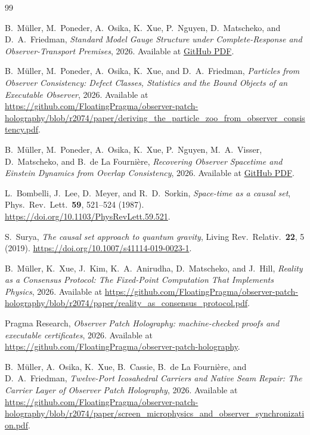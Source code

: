\documentclass[11pt]{article}
\begin{document}
\begin{thebibliography}{99}

B.~M\"uller, M.~Poneder, A.~Osika, K.~Xue, P.~Nguyen, D.~Matscheko, and D.~A.~Friedman,
\emph{Standard Model Gauge Structure under Complete-Response and Observer-Transport Premises},
2026.
Available at \href{https://github.com/FloatingPragma/observer-patch-holography/blob/r2074/paper/deriving_standard_model_gauge_structure_from_observer_overlap_consistency.pdf}{GitHub PDF}.

B.~M\"uller, M.~Poneder, A.~Osika, K.~Xue, and D.~A.~Friedman,
\emph{Particles from Observer Consistency: Defect Classes, Statistics and the Bound Objects of an Executable Observer},
2026.
Available at \url{https://github.com/FloatingPragma/observer-patch-holography/blob/r2074/paper/deriving_the_particle_zoo_from_observer_consistency.pdf}.

B.~M\"uller, M.~Poneder, A.~Osika, K.~Xue, P.~Nguyen, M.~A.~Visser, D.~Matscheko, and B.~de La Fourni\`ere,
\emph{Recovering Observer Spacetime and Einstein Dynamics from Overlap Consistency},
2026.
Available at \href{https://github.com/FloatingPragma/observer-patch-holography/blob/r2074/paper/recovering_observer_spacetime_and_einstein_dynamics_from_overlap_consistency.pdf}{GitHub PDF}.

L.~Bombelli, J.~Lee, D.~Meyer, and R.~D.~Sorkin,
\emph{Space-time as a causal set},
Phys.\ Rev.\ Lett.\ \textbf{59}, 521--524 (1987).
\url{https://doi.org/10.1103/PhysRevLett.59.521}.

S.~Surya,
\emph{The causal set approach to quantum gravity},
Living Rev.\ Relativ.\ \textbf{22}, 5 (2019).
\url{https://doi.org/10.1007/s41114-019-0023-1}.

B.~M\"uller, K.~Xue, J.~Kim, K.~A.~Anirudha, D.~Matscheko, and J.~Hill,
\emph{Reality as a Consensus Protocol: The Fixed-Point Computation That Implements Physics},
2026.
Available at \url{https://github.com/FloatingPragma/observer-patch-holography/blob/r2074/paper/reality_as_consensus_protocol.pdf}.

Pragma Research,
\emph{Observer Patch Holography: machine-checked proofs and executable certificates},
2026.
Available at \url{https://github.com/FloatingPragma/observer-patch-holography}.

B.~M\"uller, A.~Osika, K.~Xue, B.~Cassie, B.~de La Fourni\`ere, and D.~A.~Friedman,
\emph{Twelve-Port Icosahedral Carriers and Native Seam Repair: The Carrier Layer of Observer Patch Holography},
2026.
Available at \url{https://github.com/FloatingPragma/observer-patch-holography/blob/r2074/paper/screen_microphysics_and_observer_synchronization.pdf}.


\end{thebibliography}
\end{document}
